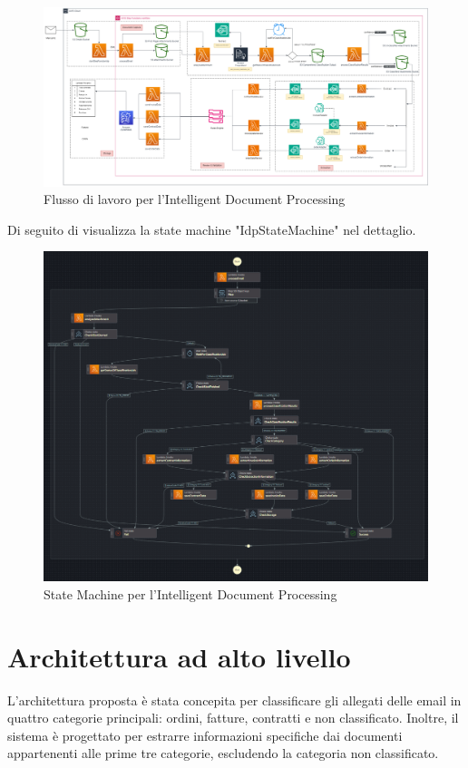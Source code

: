 \begin{figure}[h]
  \centering
  \includegraphics[width=1\textwidth]{img/design/classificatore_email.drawio.png}
  \caption{Flusso di lavoro per l'Intelligent Document Processing}
  \label{fig:IDP_workflow}
\end{figure}

Di seguito di visualizza la state machine "IdpStateMachine" nel dettaglio.

\begin{figure}[h]
  \centering
  \includegraphics[width=1.1\textwidth]{img/design/IdpStateMachine.png}
  \caption{State Machine per l'Intelligent Document Processing}
  \label{fig:IDP_state_machine}
\end{figure}

\section{Architettura ad alto livello}
L'architettura proposta è stata concepita per classificare gli allegati delle email in quattro categorie principali: ordini, fatture, contratti e non classificato. Inoltre, il sistema è progettato per estrarre informazioni specifiche dai documenti appartenenti alle prime tre categorie, escludendo la categoria non classificato.

